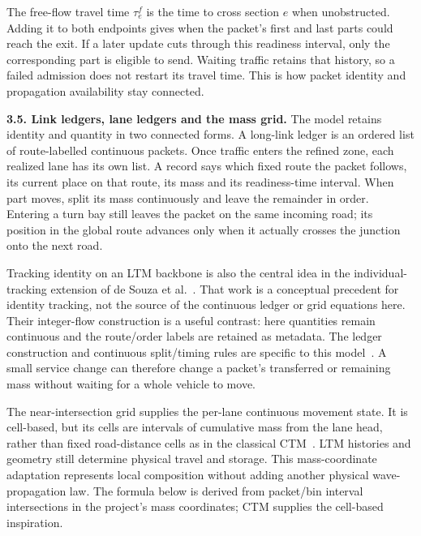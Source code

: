 \documentclass[10pt,a4paper]{article}
\newcommand{\rev}[1]{{\color{revisionred}#1}}
\begin{document}
The free-flow travel time $\tau^f_e$ is the time to cross section $e$
when unobstructed. Adding it to both endpoints gives when the packet's
first and last parts could reach the exit. If a later update cuts through
this readiness interval, only the corresponding part is eligible to send.
Waiting traffic retains that history, so a failed admission does not
restart its travel time. This is how packet identity and propagation
availability stay connected.
\par


\textbf{3.5. Link ledgers, lane ledgers and the mass grid.}
The model retains identity and quantity in two connected forms.
A long-link ledger is an ordered list of route-labelled continuous
packets. Once traffic enters the refined zone, each realized lane has
its own list. A record says which fixed route the packet follows, its
current place on that route, its mass and its readiness-time interval.
When part moves, split its mass continuously and leave the remainder
in order. Entering a turn bay still leaves the packet on the same incoming road;
its position in the global route advances only when it actually crosses
the junction onto the next road.

Tracking identity on an LTM backbone is also the central idea in the
individual-tracking extension of de Souza et al.~\cite{tracking}.
\rev{That work is a conceptual precedent for identity tracking, not the source of the continuous ledger or grid equations here.}
Their integer-flow construction is a useful contrast: here quantities
remain continuous and the route/order labels are retained as metadata.
The ledger construction and continuous split/timing rules are specific
to this model~\cite{m1}. A small service change can therefore change a
packet's transferred or remaining mass without waiting for a whole
vehicle to move.

The near-intersection grid supplies the per-lane continuous movement
state. It is cell-based, but its cells are intervals of cumulative mass
from the lane head, rather than fixed road-distance cells as in the
classical CTM~\cite{ctm}. LTM histories and geometry still determine
physical travel and storage. This mass-coordinate adaptation represents
local composition without adding another physical wave-propagation law.
\rev{The formula below is derived from packet/bin interval intersections in the project's mass coordinates; CTM supplies the cell-based inspiration.}
\end{document}
